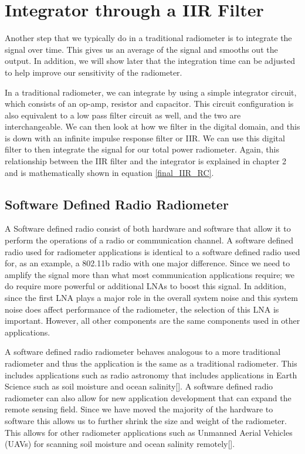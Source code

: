 \section{Integrator through a IIR Filter}

Another step that we typically do in a traditional radiometer is to integrate the signal over time.  This gives us an average of the signal and smooths out the output.  In addition, we will show later that the integration time can be adjusted to help improve our sensitivity of the radiometer.

In a traditional radiometer, we can integrate by using a simple integrator circuit, which consists of an op-amp, resistor and capacitor.  This circuit configuration is also equivalent to a low pass filter circuit as well, and the two are interchangeable.  We can then look at how we filter in the digital domain, and this is down with an infinite impulse response filter or IIR.  We can use this digital filter to then integrate the signal for our total power radiometer. Again, this relationship between the IIR filter and the integrator is explained in chapter 2 and is mathematically shown in equation \ref{final_IIR_RC}.


\subsection{Software Defined Radio Radiometer}

A Software defined radio consist of both hardware and software that allow it to perform the operations of a radio or communication channel.  A software defined radio used for radiometer applications is identical to a software defined radio used for, as an example, a 802.11b radio with one major difference.  Since we need to amplify the signal more than what most communication applications require; we do require more powerful or additional LNAs to boost this signal.  In addition, since the first LNA plays a major role in the overall system noise and this system noise does affect performance of the radiometer, the selection of this LNA is important.  However, all other components are the same components used in other applications.

A software defined radio radiometer behaves analogous to a more traditional radiometer and thus the application is the same as a traditional radiometer.  This includes applications such as radio astronomy that includes applications in Earth Science such as soil moisture and ocean salinity[\cite{Ruf}].  A software defined radio radiometer can also allow for new application development that can expand the remote sensing field.  Since we have moved the majority of the hardware to software this allows us to further shrink the size and weight of the radiometer.  This allows for other radiometer applications such as Unmanned Aerial Vehicles (UAVs) for scanning soil moisture and ocean salinity remotely[\cite{McIntyre}].  

